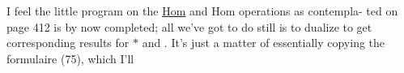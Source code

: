 I feel the little program on the \uline{Hom} and Hom  operations\hand{,} as contempla-%
ted on page 412\hand{,} is by now completed;  all we've got to do still is to
dualize  to get corresponding  results for $\ast$ and \hand{$\mathbin{\tikz[baseline=-.5ex]{\node[circle,draw,inner sep=.04em] {\ensuremath{\textcolor{black}{*}}};}}$}.  It's
just a matter of essentially copying the formulaire (75),  which I'll 


